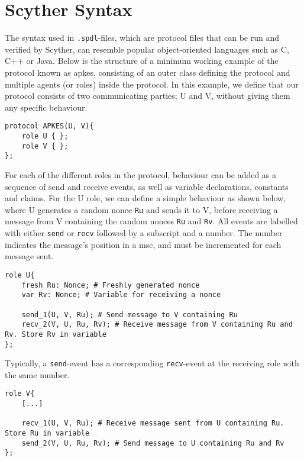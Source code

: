 \section{Scyther Syntax}


The syntax used in \verb!.spdl!-files, which are protocol files that can be run and verified by Scyther, can resemble popular object-oriented languages such as C, C++ or Java. Below is the structure of a minimum working example of the protocol known as \gls{apkes}, consisting of an outer class defining the protocol and multiple agents (or roles) inside the protocol. In this example, we define that our protocol consists of two communicating parties; U and V, without giving them any specific behaviour.\newline

\begin{lstlisting}
protocol APKES(U, V){
	role U { };
	role V { };  
};
\end{lstlisting}

For each of the different roles in the protocol, behaviour can be added as a sequence of send and receive events, as well as variable declarations, constants and claims. For the U role, we can define a simple behaviour as shown below, where U generates a random nonce \texttt{Ru} and sends it to V, before receiving a message from V containing the random nonces \texttt{Ru} and \texttt{Rv}. All events are labelled with either \texttt{send} or \texttt{recv} followed by a subscript and a number. The number indicates the message's position in a \gls{msc}, and must be incremented for each message sent.\newline

\begin{lstlisting}
role U{
	fresh Ru: Nonce; # Freshly generated nonce
	var Rv: Nonce; # Variable for receiving a nonce
	
	send_1(U, V, Ru); # Send message to V containing Ru
	recv_2(V, U, Ru, Rv); # Receive message from V containing Ru and Rv. Store Rv in variable
};
\end{lstlisting}



Typically, a \texttt{send}-event has a corresponding \texttt{recv}-event at the receiving role with the same number.\newline


\begin{lstlisting}
role V{
	[...]
	
	recv_1(U, V, Ru); # Receive message sent from U containing Ru. Store Ru in variable
	send_2(V, U, Ru, Rv); # Send message to U containing Ru and Rv
};
\end{lstlisting}

